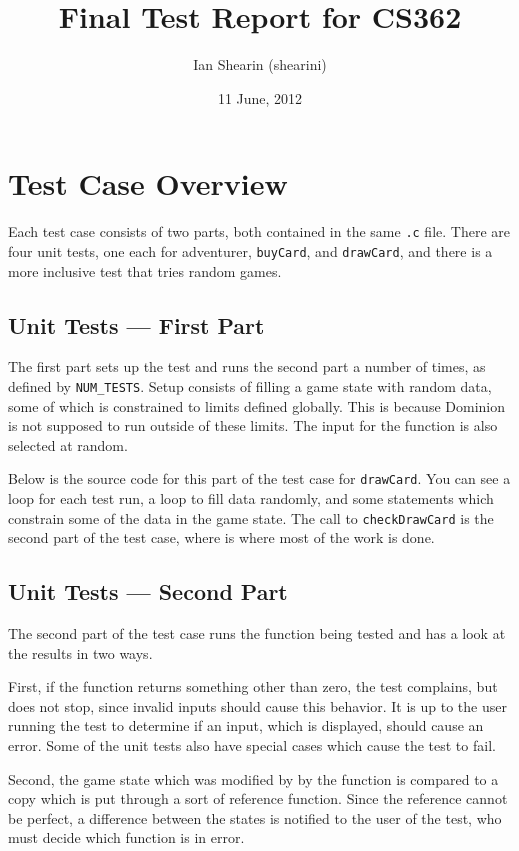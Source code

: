 \documentclass[letterpaper,12pt]{article}
\title{Final Test Report for CS362}
\date{11 June, 2012}
\author{Ian Shearin (shearini)}
\begin{document}
\maketitle


\section{Test Case Overview}
Each test case consists of two parts, both contained in the same {\tt .c} file.
There are four unit tests, one each for adventurer, {\tt buyCard}, and
{\tt drawCard}, and there is a more inclusive test that tries random games.

\subsection{Unit Tests --- First Part}
The first part sets up the test and runs the second part a number of times, as
defined by {\tt NUM\_TESTS}. Setup consists of filling a game state with
random data, some of which is constrained to limits defined globally. This is
because Dominion is not supposed to run outside of these limits. The input for
the function is also selected at random.

Below is the source code for this part of the test case for {\tt drawCard}. You
can see a loop for each test run, a loop to fill data randomly, and some
statements which constrain some of the data in the game state. The call to
{\tt checkDrawCard} is the second part of the test case, where is where most of
the work is done.

\begin{scriptsize}

\end{scriptsize}

\subsection{Unit Tests --- Second Part}
The second part of the test case runs the function being tested and has a look
at the results in two ways.

First, if the function returns something other than zero, the test complains,
but does not stop, since invalid inputs should cause this behavior. It is up to
the user running the test to determine if an input, which is displayed, should
cause an error. Some of the unit tests also have special cases which cause the
test to fail.

Second, the game state which was modified by by the function is compared to a
copy which is put through a sort of reference function. Since the reference
cannot be perfect, a difference between the states is notified to the user of
the test, who must decide which function is in error.
\end{document}
